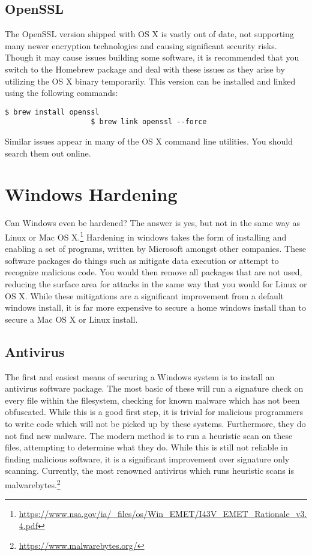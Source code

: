 			\subsection{OpenSSL}
				The OpenSSL version shipped with OS X is vastly out of date, not supporting many newer encryption technologies and causing significant security risks.
				Though it may cause issues building some software, it is recommended that you switch to the Homebrew package and deal with these issues as they arise by utilizing the OS X binary temporarily.
				This version can be installed and linked using the following commands:
				\begin{lstlisting}[style=CLI]
					$ brew install openssl
					$ brew link openssl --force
				\end{lstlisting}
				Similar issues appear in many of the OS X command line utilities.
				You should search them out online.
	\section{Windows Hardening}
		Can Windows even be hardened? The answer is yes, but not in the same way as Linux or Mac OS X.\footnote{\url{https://www.nsa.gov/ia/\_files/os/Win\_EMET/I43V\_EMET\_Rationale\_v3.4.pdf}}
		Hardening in windows takes the form of installing and enabling a set of programs, written by Microsoft amongst other companies.
		These software packages do things such as mitigate data execution or attempt to recognize malicious code.
		You would then remove all packages that are not used, reducing the surface area for attacks in the same way that you would for Linux or OS X.
		While these mitigations are a significant improvement from a default windows install, it is far more expensive to secure a home windows install than to secure a Mac OS X or Linux install.
		\subsection{Antivirus}
			The first and easiest means of securing a Windows system is to install an antivirus software package.
			The most basic of these will run a signature check on every file within the filesystem, checking for known malware which has not been obfuscated.
			While this is a good first step, it is trivial for malicious programmers to write code which will not be picked up by these systems.
			Furthermore, they do not find new malware.
			The modern method is to run a heuristic scan on these files, attempting to determine what they do.
			While this is still not reliable in finding malicious software, it is a significant improvement over signature only scanning.
			Currently, the most renowned antivirus which runs heuristic scans is malwarebytes.\footnote{\url{https://www.malwarebytes.org/}}

